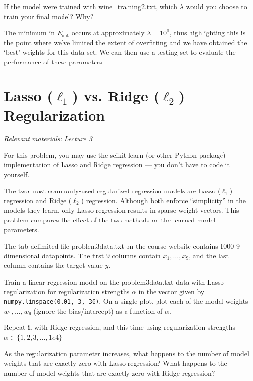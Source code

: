 \problem[4]
If the model were trained with wine\_training2.txt, which $\lambda$ would you choose to train your final model? Why?

\begin{solution}
  The minimum in $E_\text{out}$ occurs at approximately $\lambda=10^{0}$, thus highlighting this is the point where we've limited the extent of overfitting and we have obtained the `best' weights for this data set. We can then use a testing set to evaluate the performance of these parameters.
\end{solution}

\newpage
\section{Lasso (\texorpdfstring{$\ell_1$}{L1}) vs. Ridge (\texorpdfstring{$\ell_2$}{L2}) Regularization}
\textit{Relevant materials: Lecture 3}

For this problem, you may use the scikit-learn (or other Python package) implementation of Lasso and Ridge regression --- you don't have to code it yourself.

The two most commonly-used regularized regression models are Lasso ($\ell_1$) regression and Ridge ($\ell_2$) regression.
Although both enforce ``simplicity'' in the models they learn, only Lasso regression results in sparse weight vectors.
This problem compares the effect of the two methods on the learned model parameters.

\problem[12] 
The tab-delimited file problem3data.txt on the course website contains 1000 9-dimensional datapoints.  The first 9 columns contain $x_1,\ldots,x_9$, and the last column contains the target value $y$.

\subproblem
Train a linear regression model on the problem3data.txt data with Lasso regularization for regularization strengths $\alpha$ in the vector given by \texttt{numpy.linspace(0.01, 3, 30)}.
On a single plot, plot each of the model weights $w_1, ..., w_9$ (ignore the bias/intercept) as a function of $\alpha$.

\subproblem
Repeat \textbf{i.} with Ridge regression, and this time using regularization strengths $\alpha \in \{1, 2, 3, \ldots, 1e4\}$.


\subproblem
As the regularization parameter increases, what happens to the number of model weights that are exactly zero with Lasso regression?
What happens to the number of model weights that are exactly zero with Ridge regression?

